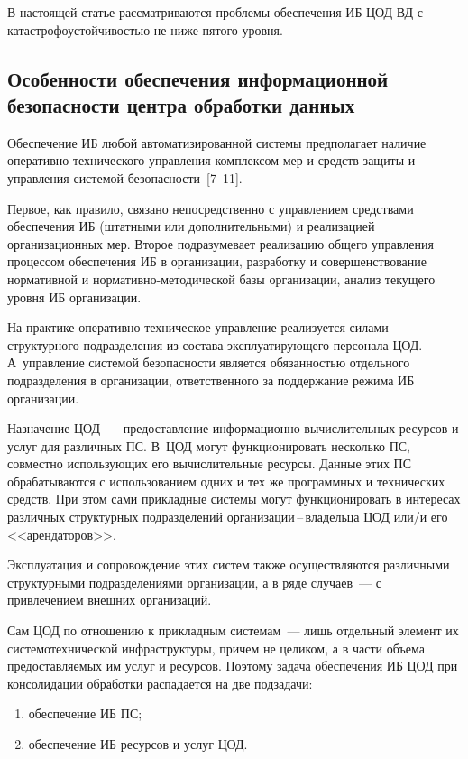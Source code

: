 \begin{multicols}{2}
       В настоящей статье рассматриваются проблемы обеспечения ИБ ЦОД ВД 
       с катастрофоустой\-чи\-востью не ниже пятого уровня.

\subsection{Особенности обеспечения информационной
безопасности центра обработки данных}

       Обеспечение ИБ любой автоматизированной сис\-те\-мы предполагает наличие 
опе\-ра\-тив\-но-тех\-ни\-че\-ско\-го управ\-ле\-ния комплексом мер и средств защиты и управления 
сис\-те\-мой безопасности~[7--11].
       
       Первое, как правило, связано непосредственно с управлением средствами 
обеспечения ИБ (штатными или дополнительными) и реализацией организационных мер. 
Второе подразумевает реализацию общего управления процессом обеспечения ИБ в 
организации, разработку и совершенствование нормативной и 
       нор\-ма\-тив\-но-ме\-то\-ди\-че\-ской базы организации, анализ текущего уровня 
ИБ организации.
       
       На практике оперативно-тех\-ни\-че\-ское управление реализуется силами 
структурного подразделения из состава эксплуатирующего персонала ЦОД. 
А~управление сис\-те\-мой безопасности является обязанностью отдельного подразделения в 
организации, ответственного за поддержание режима ИБ организации.
       
       Назначение ЦОД~--- предоставление ин\-фор\-маци\-он\-но-вы\-чис\-ли\-тель\-ных ресурсов 
и услуг для различных ПС. В~ЦОД могут функционировать несколько ПС, совместно 
использующих его вычислительные ресурсы. Данные этих ПС обрабатываются с 
использованием одних и тех же программных и технических средств. При этом сами 
прикладные сис\-те\-мы могут функционировать в интересах различных структурных 
подразделений организации\,--\,владельца ЦОД или/и его <<арендаторов>>. 

Эксплуатация 
и сопровождение этих сис\-тем также осуществляются различными структурными 
подразделениями организации, а в ряде случаев~--- с привлечением внешних организаций. 

Сам ЦОД по отношению к прикладным сис\-те\-мам~--- лишь отдельный элемент их 
сис\-те\-мо\-тех\-ни\-че\-ской инфраструктуры, причем не целиком, а в части объема 
предоставляемых им услуг и ресурсов.
       Поэтому задача обеспечения ИБ ЦОД при консолидации обработки распадается 
на две подзадачи:
       \begin{enumerate}[(1)]
\item обеспечение ИБ ПС;
\item обеспечение ИБ ресурсов и услуг ЦОД.
\end{enumerate}


\end{multicols}

